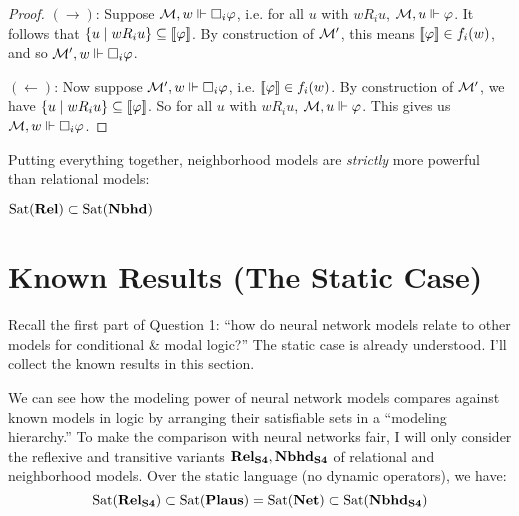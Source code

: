 \documentclass[letterpaper]{article}
\begin{document}
\begin{example*}
\begin{proof}
        $(\to)$: Suppose $\mathcal{M}, w \Vdash \Box_i \varphi$, i.e. for all $u$ with $w{R_i}u$, $\mathcal{M}, u \Vdash \varphi$.  It follows that $\{ u \mid w{R_i}u  \} \subseteq [\![\mbox{\em $ \varphi $\/}]\!]$. By construction of $\mathcal{M}'$, this means $[\![\mbox{\em $ \varphi $\/}]\!] \in f_i(w)$, and so $\mathcal{M}', w \Vdash \Box_i \varphi$.

        $(\leftarrow)$: Now suppose $\mathcal{M}', w \Vdash \Box_i \varphi$, i.e. $[\![\mbox{\em $ \varphi $\/}]\!] \in f_i(w)$.  By construction of $\mathcal{M}'$, we have $\{ u \mid w{R_i}u  \} \subseteq [\![\mbox{\em $ \varphi $\/}]\!]$.  So for all $u$ with $w{R_i}u$, $\mathcal{M}, u \Vdash \varphi$.  This gives us $\mathcal{M}, w \Vdash \Box_i \varphi$.
    \end{proof}

    Putting everything together, neighborhood models are \emph{strictly} more powerful than relational models:
    \begin{proposition}
        $\mathrm{Sat}( \textrm{\textbf{Rel}} ) \subset \mathrm{Sat}( \textrm{\textbf{Nbhd}} )$
    \end{proposition}

\end{example*}


\section*{Known Results (The Static Case)}

Recall the first part of Question 1: ``how do neural network models relate to other models for conditional \& modal logic?'' The static case is already understood. I'll collect the known results in this section.

We can see how the modeling power of neural network models compares against known models in logic by arranging their satisfiable sets in a ``modeling hierarchy.''  To make the comparison with neural networks fair, I will only consider the reflexive and transitive variants $\textrm{\textbf{Rel}}_\textrm{\textbf{S4}}, \textrm{\textbf{Nbhd}}_\textrm{\textbf{S4}}$ of relational and neighborhood models.  Over the static language (no dynamic operators), we have:
\[
\mathrm{Sat}( \textrm{\textbf{Rel}}_\textrm{\textbf{S4}} ) \subset \mathrm{Sat}( \textrm{\textbf{Plaus}} ) = \mathrm{Sat}( \textrm{\textbf{Net}} ) \subset \mathrm{Sat}( \textrm{\textbf{Nbhd}}_\textrm{\textbf{S4}} )
\]
\end{document}

